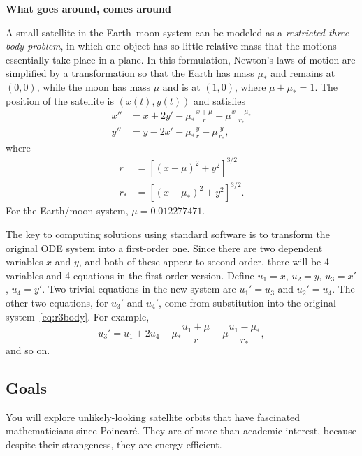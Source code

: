 \documentclass[11pt,twoside]{article}
\begin{document}
\begin{center}
  \bf What goes around, comes around
\end{center}


A small satellite in the Earth--moon system can be modeled as a \emph{restricted three-body problem}, in which one object has so little relative mass that the motions essentially take place in a plane. In this formulation, Newton's laws of motion are simplified by a transformation so that the Earth has mass $\mu_*$ and remains at $(0,0)$, while the moon has mass $\mu$ and is at $(1,0)$, where $\mu+\mu_*=1$. The position of the satellite is $(x(t),y(t))$ and satisfies
\begin{equation}
\begin{split}
  x'' &= x + 2y' - \mu_* \frac{x+\mu}{r} - \mu \frac{x-\mu_*}{r_*} \\
  y'' &= y - 2x' - \mu_* \frac{y}{r} - \mu \frac{y}{r_*}, 
\end{split}\label{eq:r3body}
\end{equation}
where
\begin{align*}
  r &= \left[ (x+\mu)^2 + y^2 \right]^{3/2} \\
	r_* &= \left[ (x-\mu_*)^2 + y^2 \right]^{3/2}.
\end{align*}
For the Earth/moon system, $\mu=0.012277471$.

The key to computing solutions using standard software is to transform the original ODE system into a first-order one. Since there are two dependent variables $x$ and $y$, and both of these appear to second order, there will be 4 variables and 4 equations in the first-order version. Define $u_1=x$, $u_2=y$, $u_3=x'$, $u_4=y'$. Two trivial equations in the new system are $u_1'=u_3$ and $u_2'=u_4$. The other two equations, for $u_3'$ and $u_4'$, come from substitution into the original system~\eqref{eq:r3body}. For example,
\begin{equation*}
  u_3' = u_1 + 2u_4 - \mu_* \frac{u_1+\mu}{r} - \mu \frac{u_1-\mu_*}{r_*},
\end{equation*}
and so on.

\subsection*{Goals}

You will explore unlikely-looking satellite orbits that have fascinated mathematicians since Poincar\'e. They are of more than academic interest, because despite their strangeness, they are energy-efficient. 
\end{document}
